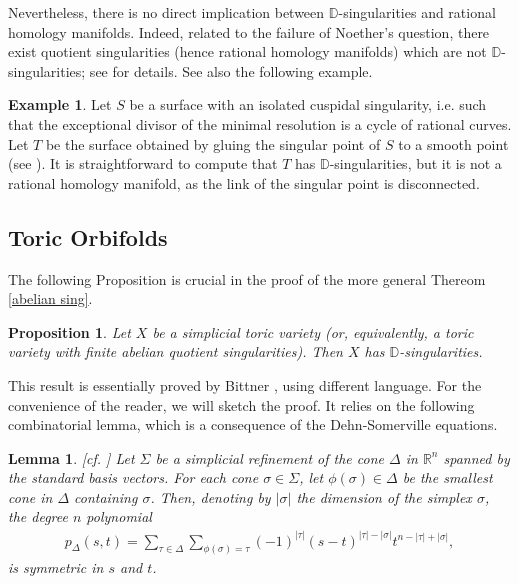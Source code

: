 \documentclass{amsart}
\newtheorem{prop}[thm]{Proposition}
\newtheorem{lem}[thm]{Lemma}
\theoremstyle{definition}
\newtheorem{exmp}[thm]{Example}
\numberwithin{equation}{section}
\begin{document}
Nevertheless, there is no direct implication between $\mathbb{D}$-singularities and rational homology manifolds. Indeed, related to the failure of Noether's question, there exist quotient singularities (hence rational homology manifolds) which are not $\mathbb{D}$-singularities; see \cite{esserquotient} for details. See also the following example.

\begin{exmp}\label{rhm example}
Let $S$ be a surface with an isolated cuspidal singularity, i.e. such that the exceptional divisor of the minimal resolution is a cycle of rational curves. Let $T$ be the surface obtained by gluing the singular point of $S$ to a smooth point (see \cite[Section $3$]{schwede}). It is straightforward to compute that $T$ has $\mathbb{D}$-singularities, but it is not a rational homology manifold, as the link of the singular point is disconnected.
\end{exmp}



\subsection{Toric Orbifolds}
The following Proposition is crucial in the proof of the more general Thereom \ref{abelian sing}.

\begin{prop}\label{toric}
Let $X$ be a simplicial toric variety (or, equivalently, a toric variety with finite abelian quotient singularities). Then $X$ has $\mathbb{D}$-singularities.
\end{prop}

This result is essentially proved by Bittner \cite[Corollary $4.2$]{bittnertoric}, using different language. For the convenience of the reader, we will sketch the proof. It relies on the following combinatorial lemma, which is a consequence of the Dehn-Somerville equations.

\begin{lem}\label{b}[cf. \cite[Lemma $4.6$]{bittnertoric}]\label{sym toric lem}
Let $\Sigma$ be a simplicial refinement of the cone $\Delta$ in $\mathbb{R}^n$ spanned by the standard basis vectors. For each cone $\sigma \in \Sigma$, let $\phi(\sigma) \in \Delta$ be the smallest cone in $\Delta$ containing $\sigma$. Then, denoting by $|\sigma|$ the dimension of the simplex $\sigma$, the degree $n$ polynomial
\begin{align*}
    p_\Delta(s,t) = \sum_{\tau \in \Delta} \sum_{\phi(\sigma) = \tau} (-1)^{|\tau|} (s-t)^{|\tau|-|\sigma|} t^{n-|\tau|+|\sigma|},
\end{align*}
is symmetric in $s$ and $t$.
\end{lem}
\end{document}
